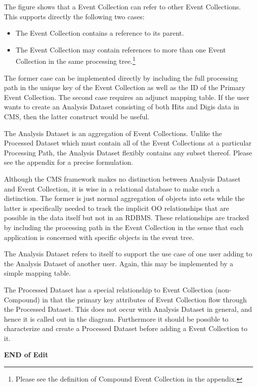 \documentclass{cmspaper}
\begin{document}
The figure shows that a Event Collection can refer to other Event Collections.  This 
supports directly the following two cases: 
\begin{itemize}
\item The Event Collection contains a reference to its parent. 
\item The Event Collection may contain references to more than one 
Event Collection in the same processing tree.\footnote{Please see the definition of
Compound Event Collection in the appendix.}
\end{itemize}
The former case can be implemented directly by including the 
full processing path in the unique key of the Event Collection as well as the 
ID of the Primary Event Collection.  The second case requires an adjunct 
mapping table. 
If the user wants to create an Analysis Dataset consisting of both Hits and 
Digis data in CMS, then the latter construct would be useful.  

The Analysis Dataset is an aggregation of Event Collections.  Unlike the 
Processed Dataset which must contain all of the Event Collections at a 
particular Processing Path, the Analysis Dataset flexibly contains any subset
thereof.  Please see the appendix for a precise formulation.

Although the CMS framework makes no distinction between Analysis Dataset and Event Collection, 
it is wise in a relational database to make such a distinction.  The former is just normal aggregation
of objects into sets while the latter is specifically needed to track the implicit
OO relationships that are possible in the data itself
but not in an RDBMS. These relationships are tracked by including the processing path in the 
Event Collection in the sense that each application is concerned with specific objects in the 
event tree.  

The Analysis Dataset refers to itself to support
the use case of one user adding to the Analysis Dataset of another user.  Again, this
may be implemented by a simple mapping table.

The Processed Dataset has a special relationship to Event Collection (non-Compound) 
in that the primary key attributes 
of Event Collection flow through the Processed Dataset.  This does not occur 
with Analysis Dataset in general, and hence it is called out in the diagram.
Furthermore it should be possible to characterize and
create a Processed Dataset before adding a Event Collection to it.  

{\bf END of Edit}
\end{document}
